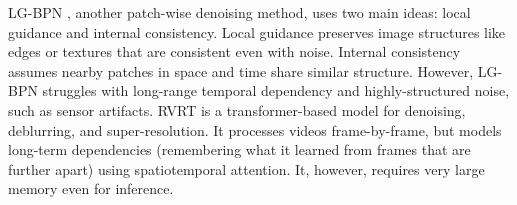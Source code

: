 LG-BPN \cite{wang2023lgbpn}, another patch-wise denoising method, uses two main ideas: local guidance and internal consistency. Local guidance preserves image structures like edges or textures that are consistent even with noise. Internal consistency assumes nearby patches in space and time share similar structure. However, LG-BPN struggles with long-range temporal dependency and highly-structured noise, such as sensor artifacts. RVRT \cite{liang2022rvrt} is a transformer-based model for denoising, deblurring, and super-resolution. It processes videos frame-by-frame, but models long-term dependencies (remembering what it learned from frames that are further apart) using spatiotemporal attention. It, however, requires very large memory even for inference. 




